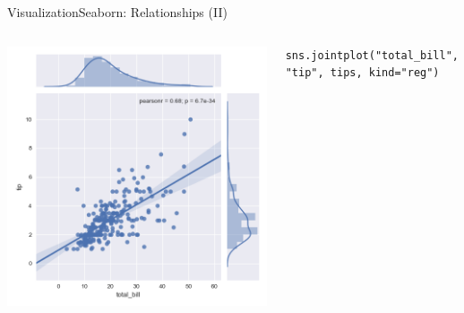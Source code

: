 \documentclass[10pt,compress]{beamer} %
\begin{document}
\begin{frame}[fragile]{Visualization}{Seaborn: Relationships (II)}
	\begin{columns}[t]
	\includegraphics[width=\textwidth]{figs/sns-jointplot.png}\\
	\begin{exampleblock}{}
	\vspace{-0.2cm} 
	\begin{lstlisting}[basicstyle=\tiny]
	sns.jointplot("total_bill", "tip", tips, kind="reg")
	\end{lstlisting}
	\vspace{-0.2cm} 
	\end{exampleblock}


\end{columns}
\end{frame}
\end{document}
